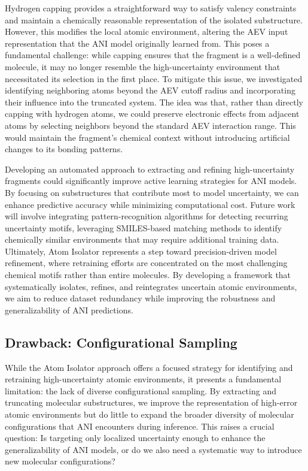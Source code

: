 Hydrogen capping provides a straightforward way to satisfy valency constraints and maintain a chemically reasonable representation of the isolated substructure. However, this modifies the local atomic environment, altering the AEV input representation that the ANI model originally learned from. This poses a fundamental challenge: while capping ensures that the fragment is a well-defined molecule, it may no longer resemble the high-uncertainty environment that necessitated its selection in the first place. To mitigate this issue, we investigated identifying neighboring atoms beyond the AEV cutoff radius and incorporating their influence into the truncated system. The idea was that, rather than directly capping with hydrogen atoms, we could preserve electronic effects from adjacent atoms by selecting neighbors beyond the standard AEV interaction range. This would maintain the fragment’s chemical context without introducing artificial changes to its bonding patterns.

Developing an automated approach to extracting and refining high-uncertainty fragments could significantly improve active learning strategies for ANI models. By focusing on substructures that contribute most to model uncertainty, we can enhance predictive accuracy while minimizing computational cost. Future work will involve integrating pattern-recognition algorithms for detecting recurring uncertainty motifs, leveraging SMILES-based matching methods \cite{SMILES_pair_encoding_li} to identify chemically similar environments that may require additional training data. Ultimately, Atom Isolator represents a step toward precision-driven model refinement, where retraining efforts are concentrated on the most challenging chemical motifs rather than entire molecules. By developing a framework that systematically isolates, refines, and reintegrates uncertain atomic environments, we aim to reduce dataset redundancy while improving the robustness and generalizability of ANI predictions.

\subsection{Drawback: Configurational Sampling}
\label{subsec:drawback_config_sampling}

While the Atom Isolator approach offers a focused strategy for identifying and retraining high-uncertainty atomic environments, it presents a fundamental limitation: the lack of diverse configurational sampling. By extracting and truncating molecular substructures, we improve the representation of high-error atomic environments but do little to expand the broader diversity of molecular configurations that ANI encounters during inference. This raises a crucial question: Is targeting only localized uncertainty enough to enhance the generalizability of ANI models, or do we also need a systematic way to introduce new molecular configurations?

